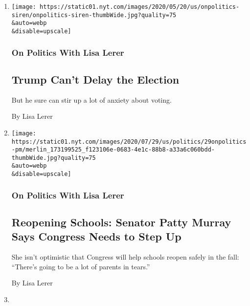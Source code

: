 \begin{enumerate}
\def\labelenumi{\arabic{enumi}.}
\item
  \href{/2020/07/30/us/politics/trump-election-delay-distraction.html}{}

  \texttt{[image: https://static01.nyt.com/images/2020/05/20/us/onpolitics-siren/onpolitics-siren-thumbWide.jpg?quality=75\\\&auto=webp\\\&disable=upscale]}

  \hypertarget{on-politics-with-lisa-lerer}{%
  \subsubsection{On Politics With Lisa
  Lerer}\label{on-politics-with-lisa-lerer}}

  \hypertarget{trump-cant-delay-the-election}{%
  \subsection{Trump Can't Delay the
  Election}\label{trump-cant-delay-the-election}}

  But he sure can stir up a lot of anxiety about voting.

  By Lisa Lerer
\item
  \href{/2020/07/29/us/politics/patty-murray-schools-reopening.html}{}

  \texttt{[image: https://static01.nyt.com/images/2020/07/29/us/politics/29onpolitics-pm/merlin\_173199525\_f123106e-0683-4e1c-88b8-a33a6c060bdd-thumbWide.jpg?quality=75\\\&auto=webp\\\&disable=upscale]}

  \hypertarget{on-politics-with-lisa-lerer-1}{%
  \subsubsection{On Politics With Lisa
  Lerer}\label{on-politics-with-lisa-lerer-1}}

  \hypertarget{reopening-schools-senator-patty-murray-says-congress-needs-to-step-up}{%
  \subsection{Reopening Schools: Senator Patty Murray Says Congress
  Needs to Step
  Up}\label{reopening-schools-senator-patty-murray-says-congress-needs-to-step-up}}

  She isn't optimistic that Congress will help schools reopen safely in
  the fall: ``There's going to be a lot of parents in tears.''

  By Lisa Lerer
\item
  \href{/2020/07/27/us/politics/a-republican-panic-button.html}{}


\end{enumerate}
